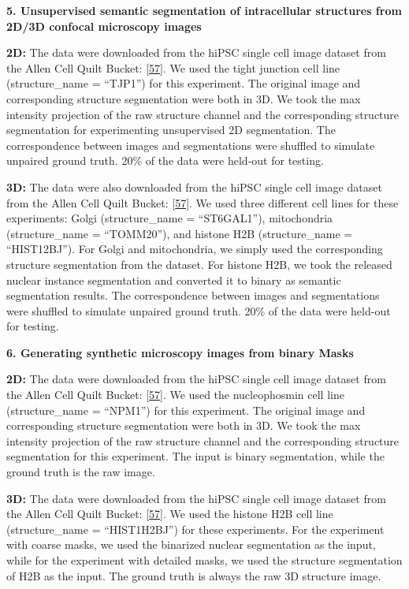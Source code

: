 \textbf{5. Unsupervised semantic segmentation of intracellular structures from 2D/3D confocal microscopy images}

\textbf{2D:} The data were downloaded from the hiPSC single cell image dataset from the Allen Cell Quilt Bucket: {[}\protect\hyperlink{ref-vm45dW9e}{57}{]}. We used the tight junction cell line (structure\_name = ``TJP1'') for this experiment. The original image and corresponding structure segmentation were both in 3D. We took the max intensity projection of the raw structure channel and the corresponding structure segmentation for experimenting unsupervised 2D segmentation. The correspondence between images and segmentations were shuffled to simulate unpaired ground truth. 20\% of the data were held-out for testing.

\textbf{3D:} The data were also downloaded from the hiPSC single cell image dataset from the Allen Cell Quilt Bucket: {[}\protect\hyperlink{ref-vm45dW9e}{57}{]}. We used three different cell lines for these experiments: Golgi (structure\_name = ``ST6GAL1''), mitochondria (structure\_name = ``TOMM20''), and histone H2B (structure\_name = ``HIST12BJ''). For Golgi and mitochondria, we simply used the corresponding structure segmentation from the dataset. For histone H2B, we took the released nuclear instance segmentation and converted it to binary as semantic segmentation results. The correspondence between images and segmentations were shuffled to simulate unpaired ground truth. 20\% of the data were held-out for testing.

\textbf{6. Generating synthetic microscopy images from binary Masks}

\textbf{2D:} The data were downloaded from the hiPSC single cell image dataset from the Allen Cell Quilt Bucket: {[}\protect\hyperlink{ref-vm45dW9e}{57}{]}. We used the nucleophosmin cell line (structure\_name = ``NPM1'') for this experiment. The original image and corresponding structure segmentation were both in 3D. We took the max intensity projection of the raw structure channel and the corresponding structure segmentation for this experiment. The input is binary segmentation, while the ground truth is the raw image.

\textbf{3D:} The data were downloaded from the hiPSC single cell image dataset from the Allen Cell Quilt Bucket: {[}\protect\hyperlink{ref-vm45dW9e}{57}{]}. We used the histone H2B cell line (structure\_name = ``HIST1H2BJ'') for these experiments. For the experiment with coarse masks, we used the binarized nuclear segmentation as the input, while for the experiment with detailed masks, we used the structure segmentation of H2B as the input. The ground truth is always the raw 3D structure image.


